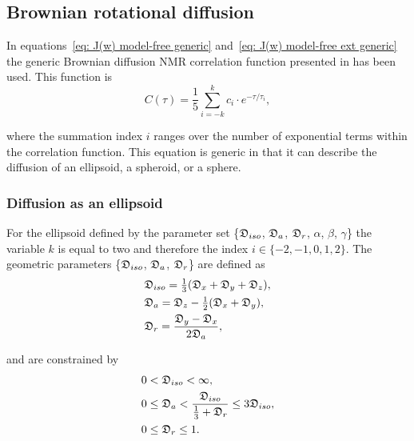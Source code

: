 \begin{htmlonly}
\begin{htmlonly}
\subsection{Brownian rotational diffusion}

In equations~\eqref{eq: J(w) model-free generic} and~\eqref{eq: J(w) model-free ext generic} the generic Brownian diffusion NMR correlation function presented in \citet{dAuvergne06} has been used.  This function is
\begin{equation} \label{eq: C(tau) generic}
    C(\tau) = \frac{1}{5} \sum_{i=-k}^k c_i \cdot e^{-\tau/\tau_i},
\end{equation}

\noindent where the summation index $i$ ranges over the number of exponential terms within the correlation function.  This equation is generic in that it can describe the diffusion of an ellipsoid, a spheroid, or a sphere.



\subsubsection{Diffusion as an ellipsoid}

For the ellipsoid defined by the parameter set \{$\mathfrak{D}_{iso}$, $\mathfrak{D}_a$, $\mathfrak{D}_r$, $\alpha$, $\beta$, $\gamma$\} the variable $k$ is equal to two and therefore the index $i \in \{-2, -1, 0, 1, 2\}$.  The geometric parameters \{$\mathfrak{D}_{iso}$, $\mathfrak{D}_a$, $\mathfrak{D}_r$\} are defined as
\begin{subequations}
\begin{align}
    & \mathfrak{D}_{iso} = \tfrac{1}{3} (\mathfrak{D}_x + \mathfrak{D}_y + \mathfrak{D}_z ),   \label{eq: Diso ellipsoid def} \\
    & \mathfrak{D}_a = \mathfrak{D}_z - \tfrac{1}{2}(\mathfrak{D}_x + \mathfrak{D}_y),         \label{eq: Da ellipsoid def} \\
    & \mathfrak{D}_r = \frac{\mathfrak{D}_y - \mathfrak{D}_x}{2\mathfrak{D}_a},                \label{eq: Dr ellipsoid def}
\end{align}
\end{subequations}

\noindent and are constrained by
\begin{subequations}
\begin{align}
    0 & < \mathfrak{D}_{iso} < \infty,                                                    \label{eq: Diso lim} \\
    0 & \le \mathfrak{D}_a < \frac{\mathfrak{D}_{iso}}{\tfrac{1}{3} + \mathfrak{D}_r} \le 3\mathfrak{D}_{iso}, \label{eq: Da lim} \\
    0 & \le \mathfrak{D}_r \le 1.                                                         \label{eq: Dr lim}
\end{align}
\end{subequations}


\end{htmlonly}
\end{htmlonly}
